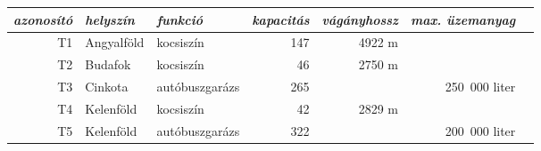 \sf
\centering
\begin{tabular}{rllrrrr}
	\toprule
	\it azonosító & \it helyszín & \it funkció    & \it kapacitás & \it vágányhossz & \it max. üzemanyag &  \\ \midrule
	           T1 & Angyalföld   & kocsiszín      &           147 &          4922 m &                    &  \\
	           T2 & Budafok      & kocsiszín      &            46 &          2750 m &                    &  \\
	           T3 & Cinkota      & autóbuszgarázs &           265 &                 &      250~000 liter &  \\
	           T4 & Kelenföld    & kocsiszín      &            42 &          2829 m &                    &  \\
	           T5 & Kelenföld    & autóbuszgarázs &           322 &                 &      200~000 liter &  \\ \bottomrule
\end{tabular}

